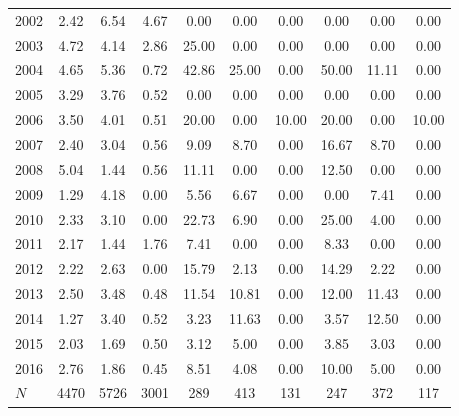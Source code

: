 \begin{table}[htbp]
\begin{tabular}{l*{9}{c}}
2002      &     2.42&     6.54&     4.67&     0.00&     0.00&     0.00&     0.00&     0.00&     0.00\\
2003      &     4.72&     4.14&     2.86&    25.00&     0.00&     0.00&     0.00&     0.00&     0.00\\
2004      &     4.65&     5.36&     0.72&    42.86&    25.00&     0.00&    50.00&    11.11&     0.00\\
2005      &     3.29&     3.76&     0.52&     0.00&     0.00&     0.00&     0.00&     0.00&     0.00\\
2006      &     3.50&     4.01&     0.51&    20.00&     0.00&    10.00&    20.00&     0.00&    10.00\\
2007      &     2.40&     3.04&     0.56&     9.09&     8.70&     0.00&    16.67&     8.70&     0.00\\
2008      &     5.04&     1.44&     0.56&    11.11&     0.00&     0.00&    12.50&     0.00&     0.00\\
2009      &     1.29&     4.18&     0.00&     5.56&     6.67&     0.00&     0.00&     7.41&     0.00\\
2010      &     2.33&     3.10&     0.00&    22.73&     6.90&     0.00&    25.00&     4.00&     0.00\\
2011      &     2.17&     1.44&     1.76&     7.41&     0.00&     0.00&     8.33&     0.00&     0.00\\
2012      &     2.22&     2.63&     0.00&    15.79&     2.13&     0.00&    14.29&     2.22&     0.00\\
2013      &     2.50&     3.48&     0.48&    11.54&    10.81&     0.00&    12.00&    11.43&     0.00\\
2014      &     1.27&     3.40&     0.52&     3.23&    11.63&     0.00&     3.57&    12.50&     0.00\\
2015      &     2.03&     1.69&     0.50&     3.12&     5.00&     0.00&     3.85&     3.03&     0.00\\
2016      &     2.76&     1.86&     0.45&     8.51&     4.08&     0.00&    10.00&     5.00&     0.00\\
\hline
\(N\)     &     4470&     5726&     3001&      289&      413&      131&      247&      372&      117\\
\hline\hline
\end{tabular}
\end{table}
